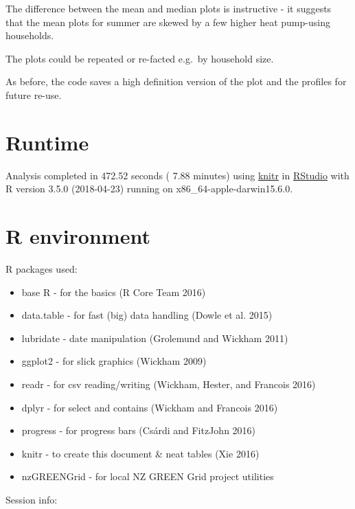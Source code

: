 \documentclass[]{article}
\providecommand{\tightlist}{%
  \setlength{\itemsep}{0pt}\setlength{\parskip}{0pt}}
\begin{document}
The difference between the mean and median plots is instructive - it
suggests that the mean plots for summer are skewed by a few higher heat
pump-using households.

The plots could be repeated or re-facted e.g.~by household size.

As before, the code saves a high definition version of the plot and the
profiles for future re-use.

\section{Runtime}\label{runtime}

Analysis completed in 472.52 seconds ( 7.88 minutes) using
\href{https://cran.r-project.org/package=knitr}{knitr} in
\href{http://www.rstudio.com}{RStudio} with R version 3.5.0 (2018-04-23)
running on x86\_64-apple-darwin15.6.0.

\section{R environment}\label{r-environment}

R packages used:

\begin{itemize}
\tightlist
\item
  base R - for the basics (R Core Team 2016)
\item
  data.table - for fast (big) data handling (Dowle et al. 2015)
\item
  lubridate - date manipulation (Grolemund and Wickham 2011)
\item
  ggplot2 - for slick graphics (Wickham 2009)
\item
  readr - for csv reading/writing (Wickham, Hester, and Francois 2016)
\item
  dplyr - for select and contains (Wickham and Francois 2016)
\item
  progress - for progress bars (Csárdi and FitzJohn 2016)
\item
  knitr - to create this document \& neat tables (Xie 2016)
\item
  nzGREENGrid - for local NZ GREEN Grid project utilities
\end{itemize}

Session info:
\end{document}
